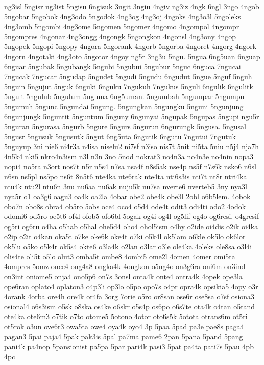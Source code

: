 ng3isl
5ngisr
ng3ist
5ngisu
6ngisuk
3ngit
3ngiu
4ngiv
ng3iz
4ngk
6ngl
3ngo
4ngob
5ngobar
5ngobok
4ng3odo
5ngodok
4ng3og
4ng3oj
4ngoks
4ng3o3l
5ngoleks
4ng3omb
5ngombi
4ng3ome
5ngomen
5ngomer
4ngomo
4ngompol
4ngompr
5ngompres
4ngonar
4ng3ongg
4ngongk
5ngongkon
4ngonsl
4ng3ony
4ngop
5ngopek
5ngopi
5ngopy
4ngora
5ngorank
4ngorb
5ngorba
4ngoret
4ngorg
4ngork
4ngorn
4ngotaki
4ng3oto
5ngotor
4ngoy
ng5r
3ng3u
5ngu.
5ngua
6ng5uan
6nguap
6nguar
5ngubak
5ngubangk
5ngubi
5ngubui
5ngubur
5nguc
6nguca
7ngucai
7ngucak
7ngucar
5ngudap
5ngudet
5ngudi
5ngudu
6ngudut
5ngue
5nguf
5nguh
5nguin
5ngujut
5nguk
6nguki
6nguku
7ngukuh
7ngukus
5nguli
6ngulik
6ngulitk
5ngult
5ngulub
5ngulum
5nguma
6ng5uman.
5ngumbah
5ngumpar
5ngumpu
5ngumuh
5ngunc
5ngundai
5ngung.
5ngungkan
5ngungku
5nguni
5ngunjung
6ngunjungk
5nguntit
5nguntum
5nguny
6ngunyai
5ngupak
5ngupas
5ngupi
ngu5r
5nguran
5ngurasa
5ngurb
5ngure
5ngurs
5ngurun
6ngurungk
5ngusa.
5ngusal
5ngusr
5ngusuk
5ngusutk
5ngut
6ng5uta
6ngutik
6ngutu
7ngutui
7ngutuk
5nguyup
3ni
nie6
ni4r3a
n4isa
niselu2
ni7sf
n3iso
nis7t
5nit
ni5ta
5niu
n5j4
nja7h
4n5k4
nki5
nkro4n3ism
n3l
n3n
3no
5nod
nokrat3
no4n3a
no4n3e
no4nin
nopa3
nopi4
no5ra
n3ort
nos7t
n5r
n5s4
n7sa
nsa4f
n8s5ak
nse4p
ns5f
n7s6k
nsko6
n6sl
n6sn
ns5pl
ns5po
ns6t
8n5t6
nte4ka
nte6rak
nte4ta
nti6s3is
nti7t
nt8r
ntri4ka
ntu4k
ntu2l
ntu6n
3nu
nu6aa
nu6ak
nuju5k
nu7sa
nverte6
nverteb5
3ny
nya3l
nya5r
o1
oa3g6
oagu3
oa4k
oa2la
4obar
obe2
obe4k
obe3l
2obl
o6b5lem.
4obok
obo7n
obo8s
obra4
ob5ro
5obs
oce4
oco4
o5d4
ode4t
odit3
odi4ti
odo2
4odok
odomi6
od5ro
oe5t6
of4l
ofob5
ofo6bl
5ogak
og4i
og4l
og5lif
og4o
og6resi.
o4gresif
og5ri
og6ru
o4ha
o5hab
o5hal
ohe5d4
oho4
ohol5ism
o4hy
o2ide
oi4dis
o2ik
oi4ka
o2ip
o2it
o4kan
oka5t
o7ke
oke6k
oke4t
o7ki
o5k4l
ok5lam
o6kle
ok5lo
ok6lor
ok5lu
o5ko
o5k4r
ok5s4
okte6
o3la4k
o2lan
o3lar
o3le
ole4ka
4oleks
ole8sa
o3l4i
olis4te
oli5t
o5lo
olut3
omba5t
ombe8
4ombi5
ome2l
4omen
4omer
omi5ta
4ompres
5omz
once4
ong4a8
ongka4k
4ongkon
o5ng4o
on3g6ra
oni6m
on3ind
on3int
oniome5
onja4
ono5p6
on7s
3onsl
onta4k
onte4
ontra4k
4opek
ope3la
ope6ran
oplato4
oplaton3
o4p3li
op3lo
o5po
opo7s
o4pr
opra4k
opsikia5
4opy
o3r
4orank
4orba
ore4h
ore4k
or4fa
3org
7orie
o5ro
or8san
ose6r
ose8sa
o7sf
osiona3
osional4
o6s3ism
o5sk
o8ska
os4ke
o6skr
o5s4p
os6po
o6s7te
ota4k
o4tan
o5tand
ote4ka
ote6m3
o7tik
o7to
otome5
5otono
4otor
oto6s5k
5otota
otrans6m
ot5ri
ot5rok
o3un
ove6r3
owa5ta
owe4
oya4k
oyo4
3p
5paa
5pad
pa3e
pae8s
paga4
pagan3
5pai
paja4
5pak
pak3is
5pal
pa7ma
pame6
2pan
5pana
5pand
5pang
pani4k
pa4nop
5pansionist
pa5pa
5par
pari4k
pasi3
5pat
pa4ta
pati7s
5pau
4pb
4pc

